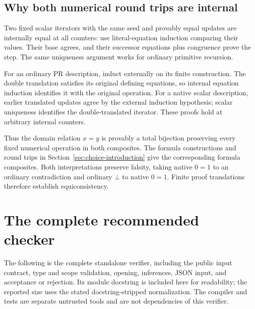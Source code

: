 \documentclass[11pt,letterpaper]{article}
\theoremstyle{definition}
\begin{document}
\subsection{Why both numerical round trips are internal}

Two fixed scalar iterators with the same seed and provably equal
updates are internally equal at all counters: use literal-equation
induction comparing their values. Their base agrees, and their
successor equations plus congruence prove the step. The same
uniqueness argument works for ordinary primitive recursion.

For an ordinary PR description, induct externally on its finite
construction. The double translation satisfies its original
defining equations, so internal equation induction identifies it
with the original operation. For a native scalar description,
earlier translated updates agree by the external induction
hypothesis; scalar uniqueness identifies the double-translated
iterator. These proofs hold at arbitrary internal counters.

Thus the domain relation $x=y$ is provably a total bijection
preserving every fixed numerical operation in both composites.
The formula constructions and round trips in
Section~\ref{sec:choice-introduction} give the corresponding formula
composites. Both interpretations preserve falsity, taking native
$0=1$ to an ordinary contradiction and ordinary $\bot$ to native
$0=1$. Finite proof translations therefore establish equiconsistency.


\clearpage
\section{The complete recommended checker}
\label{app:complete-checker}
The following is the complete standalone verifier, including the
public input contract, type and scope validation, opening,
inferences, JSON input, and acceptance or rejection. Its module
docstring is included here for readability; the reported size
uses the stated docstring-stripped normalization. The compiler
and tests are separate untrusted tools and are not dependencies
of this verifier.
\end{document}
